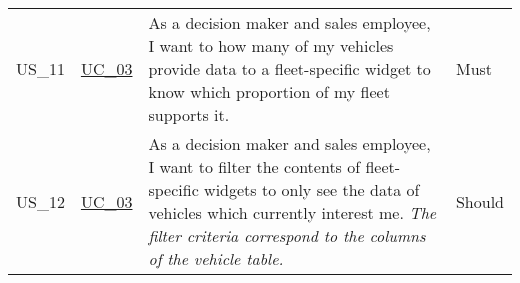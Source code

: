 \begin{footnotesize}
\begin{longtable}[L L L L]{ p{} p{} p{} p{}}
      \hypertarget{Ref:US11}{US\_11} & \hyperlink{Ref:UC3}{UC\_03} & As a decision maker and sales employee, I want to how many of my vehicles provide data to a fleet-specific widget to know which proportion of my fleet supports it. & Must \\

      \hypertarget{Ref:US12}{US\_12} & \hyperlink{Ref:UC3}{UC\_03} & As a decision maker and sales employee, I want to filter the contents of fleet-specific widgets to only see the data of vehicles which currently interest me.
      \newline\newline
      \emph{The filter criteria correspond to the columns of the vehicle table.}
      & Should \\

      \bottomrule
    \end{longtable}
  \end{footnotesize}
  \rmfamily

